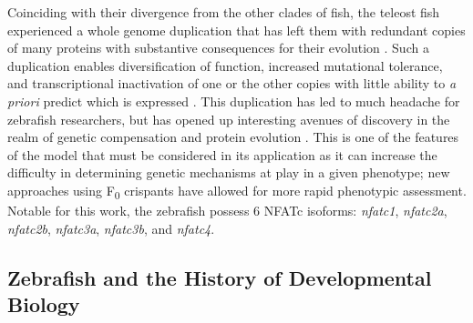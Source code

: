 Coinciding with their divergence from the other clades of fish, the teleost fish experienced a whole genome duplication that has left them with redundant copies of many proteins with substantive consequences for their evolution \citep{Amores2011, Glasauer2014, Howe2013, Meyer1999}. Such a duplication enables diversification of function, increased mutational tolerance, and transcriptional inactivation of one or the other copies with little ability to \textit{a priori} predict which is expressed \citep{Opazo2013, Voldoire2017}. This duplication has led to much headache for zebrafish researchers, but has opened up interesting avenues of discovery in the realm of genetic compensation and protein evolution \citep{Rossi2015, ElBrolosy2017, ElBrolosy2019, Sztal2020, Stainier2015, Moleri2011, Boudinot2011, Stainier2017, Kontarakis2020}. This is one of the features of the model that must be considered in its application as it can increase the difficulty in determining genetic mechanisms at play in a given phenotype; new approaches using F\textsubscript{0} crispants have allowed for more rapid phenotypic assessment. Notable for this work, the zebrafish possess 6 NFATc isoforms: \textit{nfatc1}, \textit{nfatc2a}, \textit{nfatc2b}, \textit{nfatc3a}, \textit{nfatc3b}, and \textit{nfatc4}.

\subsection{Zebrafish and the History of Developmental Biology}\label{zfhist}

